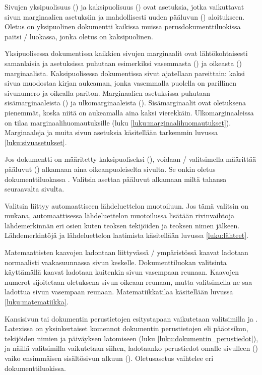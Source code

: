Sivujen yksipuolisuus () ja kaksipuolisuus
() ovat asetuksia, jotka vaikuttavat sivun marginaalien
asetuksiin ja mahdollisesti uuden pääluvun ()
aloitukseen. Oletus on yksipuolinen dokumentti kaikissa muissa
perusdokumenttiluokissa paitsi \-/ luokassa, jonka oletus
on kaksipuolinen.

Yksipuolisessa dokumentissa kaikkien sivujen marginaalit ovat
lähtökohtaisesti samanlaisia ja asetuksissa puhutaan esimerkiksi
vasemmasta () ja oikeasta ()
marginaalista. Kaksipuolisessa dokumentissa sivut ajatellaan pareittain:
kaksi sivua muodostaa kirjan aukeaman, jonka vasemmalla puolella on
parillinen sivunumero ja oikealla pariton. Marginaalien asetuksissa
puhutaan sisämarginaaleista () ja ulkomarginaaleista
(). Sisämarginaalit ovat oletuksena pienemmät, koska
niitä on aukeamalla aina kaksi vierekkäin. Ulkomarginaaleissa on tilaa
marginaalihuomautuksille (luku \ref{luku:marginaalihuomautukset}).
Marginaaleja ja muita sivun asetuksia käsitellään tarkemmin luvussa
\ref{luku:sivuasetukset}.

Jos dokumentti on määritetty kaksipuoliseksi (), voidaan
\-/ valitsimella määrittää pääluvut
() alkamaan aina oikeanpuoleiselta sivulta. Se onkin
oletus dokumenttiluokassa . Valitsin 
asettaa pääluvut alkamaan miltä tahansa seuraavalta sivulta.

Valitsin  liittyy automaattiseen lähdeluettelon
muotoiluun. Jos tämä valitsin on mukana, automaattisessa lähdeluettelon
muotoilussa lisätään rivinvaihtoja lähdemerkinnän eri osien kuten
teoksen tekijöiden ja teoksen nimen jälkeen. Lähdemerkintöjä ja
lähdeluettelon laatimista käsitellään luvussa \ref{luku:lähteet}.

Matemaattisten kaavojen ladontaan liittyvässä \-/
ympäristössä kaavat ladotaan normaalisti vaakasuunnassa sivun keskelle.
Dokumenttiluokan valitsinta  käyttämällä kaavat ladotaan
kuitenkin sivun vasempaan reunaan. Kaavojen numerot sijoitetaan
oletuksena sivun oikeaan reunaan, mutta valitsimella  ne
saa ladottua sivun vasempaan reunaan. Matematiikkatilaa käsitellään
luvussa \ref{luku:matematiikka}.

Kansisivun tai dokumentin perustietojen esitystapaan vaikutetaan
valitsimilla  ja . Latexissa
on yksinkertaiset komennot dokumentin perustietojen eli pääotsikon,
tekijöiden nimien ja päiväyksen latomiseen (luku
\ref{luku:dokumentin_perustiedot}), ja näillä valitsimilla vaikutetaan
siihen, ladotaanko perustiedot omalle sivulleen ()
vaiko ensimmäisen sisältösivun alkuun ().
Oletus\-asetus vaihtelee eri dokumenttiluokissa.

